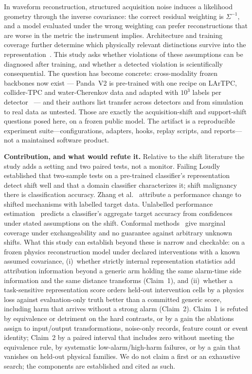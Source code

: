 \documentclass[10pt,twocolumn]{extarticle}
\begin{document}
In waveform reconstruction, structured acquisition noise induces a likelihood
geometry through the inverse covariance: the correct residual weighting is
$\Sigma^{-1}$, and a model evaluated under the wrong weighting can prefer
reconstructions that are worse in the metric the instrument implies.
Architecture and training coverage further determine which physically relevant
distinctions survive into the representation~\cite{paper1}. This study asks
whether violations of these assumptions can be diagnosed after training, and
whether a detected violation is scientifically consequential. The question has
become concrete: cross-modality frozen backbones now exist --- Panda~V2 is
pre-trained with one recipe on LArTPC, collider-TPC and water-Cherenkov data
and adapted with $10^3$ labels per detector~\cite{panda2} --- and their authors
list transfer across detectors and from simulation to real data as untested.
Those are exactly the acquisition-shift and support-shift questions posed
here, on a frozen public model. The artifact is a
reproducible experiment suite---configurations, adapters, hooks, replay
scripts, and reports---not a maintained software product.

\textbf{Contribution, and what would refute it.} Relative to the shift
literature the study adds a setting and two paired tests, not a monitor.
Failing Loudly~\cite{rabanser2019} established that two-sample tests on a
pre-trained classifier's representation detect shift well and that a domain
classifier characterizes it; shift malignancy there is classification
accuracy. Zhang et al.~\cite{zhang2023} attribute a performance change to
shifted mechanisms with labelled target data. Unlabelled performance
estimation~\cite{guillory2021,garg2022} predicts a classifier's aggregate
target accuracy from confidences under stated assumptions on the shift.
Conformal methods~\cite{angelopoulos2021} give marginal coverage under
exchangeability and no guarantee against arbitrary unknown shifts. What this
study can establish beyond these is narrow and checkable: on a frozen physics
reconstruction model under declared interventions with a known assumed
covariance, (i)~whether strictly internal representation statistics add
attribution information beyond a generic arm holding the same alarm-time
side information and the same distance transforms (Claim~1), and
(ii)~whether a task-sensitive representation score orders held-out
intervention cells by a physics loss against evaluation-only truth better
than a committed generic score, including harm that arrives without a strong
alarm (Claim~2). Claim~1 is refuted by equivalence or detriment on the hard
contrasts, or by a gain the ablations assign to input/output transformations,
noise-only records, feature count or event identity; Claim~2 by a paired
interval that includes zero without meeting the equivalence rule, by
systematic low-alarm/high-harm failures, or by a gain that vanishes on
held-out physical families. We do not claim a first or an exhaustive search;
the components are established and cited as such.
\end{document}
